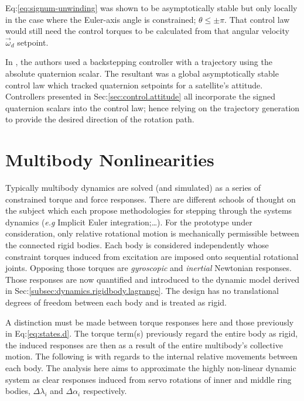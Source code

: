 Eq:\ref{eq:signum-unwinding} was shown to be asymptotically stable but only locally in the case where the Euler-axis angle is constrained; $\theta\leq \pm\pi$. That control law  would still need the control torques to be calculated from that angular velocity $\vec{\omega}_d$ setpoint.
\par
In \cite{intelligentbackstep}, the authors used a backstepping controller with a trajectory using the absolute quaternion scalar. The resultant was a global asymptotically stable control law which tracked quaternion setpoints for a satellite's attitude. Controllers presented in Sec:\ref{sec:control.attitude} all incorporate the signed quaternion scalars into the control law;  hence relying on the trajectory generation to provide the desired direction of the rotation path.
\section{Multibody Nonlinearities}
\label{sec:dynamics.nonlinearities}
Typically multibody dynamics are solved (and simulated) as a series of constrained torque and force responses. There are different schools of thought on the subject which each propose methodologies for stepping through the systems dynamics (\emph{e.g} Implicit Euler integration;\cite{physicallybased,multibodydynamics}\ldots). For the prototype under consideration, only relative rotational motion is mechanically permissible between the connected rigid bodies. Each body is considered independently whose constraint torques induced from excitation are imposed onto sequential rotational joints. Opposing those torques are \emph{gyroscopic} and \emph{inertial} Newtonian responses. Those responses are now quantified and introduced to the dynamic model derived in Sec:\ref{subsec:dynamics.rigidbody.lagrange}. The design has no translational degrees of freedom between each body and is treated as rigid.
\par
A distinction must be made between torque responses here and those previously in Eq:\ref{eq:states.d}. The torque term(s) previously regard the entire body as rigid, the induced responses are then as a result of the entire multibody's collective motion. The following is with regards to the internal relative movements between each body. The analysis here aims to approximate the highly non-linear dynamic system as clear responses induced from servo rotations of inner and middle ring bodies, $\Delta\lambda_i$ and $\Delta\alpha_i$ respectively.
